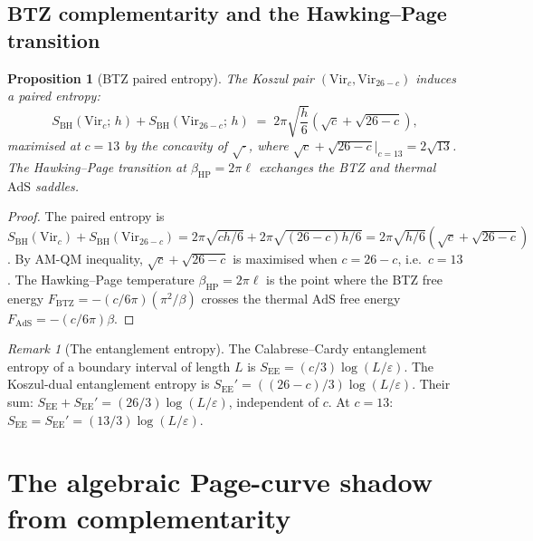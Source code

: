 \documentclass[11pt,reqno]{amsart}
\newtheorem{proposition}[theorem]{Proposition}
\theoremstyle{definition}
\theoremstyle{remark}
\newtheorem{remark}[theorem]{Remark}
\begin{document}
\subsection{BTZ complementarity and the Hawking--Page transition}

\begin{proposition}[BTZ paired entropy]
\label{prop:btz-complementarity}
The Koszul pair $(\mathrm{Vir}_c, \mathrm{Vir}_{26-c})$ induces
a paired entropy:
\begin{equation}\label{eq:btz-paired}
S_{\mathrm{BH}}(\mathrm{Vir}_c;\, h)
+ S_{\mathrm{BH}}(\mathrm{Vir}_{26-c};\, h)
\;=\;
2\pi\sqrt{\frac{h}{6}}\!\left(\sqrt{c} + \sqrt{26-c}\right)\!,
\end{equation}
maximised at $c = 13$ by the concavity of\/ $\sqrt{\cdot}$,
where
$\sqrt{c} + \sqrt{26-c}|_{c=13} = 2\sqrt{13}$.
The Hawking--Page transition at $\beta_{\mathrm{HP}} = 2\pi\ell$
exchanges the BTZ and thermal $\mathrm{AdS}$ saddles.
\end{proposition}

\begin{proof}
The paired entropy is
$S_{\mathrm{BH}}(\mathrm{Vir}_c) + S_{\mathrm{BH}}(\mathrm{Vir}_{26-c})
= 2\pi\sqrt{ch/6} + 2\pi\sqrt{(26-c)h/6}
= 2\pi\sqrt{h/6}(\sqrt{c} + \sqrt{26-c})$.
By AM-QM inequality, $\sqrt{c} + \sqrt{26-c}$ is maximised when
$c = 26-c$, i.e.\ $c = 13$. The Hawking--Page temperature
$\beta_{\mathrm{HP}} = 2\pi\ell$ is the point where the BTZ free
energy $F_{\mathrm{BTZ}} = -(c/6\pi)(\pi^2/\beta)$ crosses the
thermal $\mathrm{AdS}$ free energy
$F_{\mathrm{AdS}} = -(c/6\pi)\beta$.
\end{proof}

\begin{remark}[The entanglement entropy]
\label{rem:entanglement}
The Calabrese--Cardy entanglement entropy of a boundary interval
of length $L$ is
$S_{\mathrm{EE}} = (c/3)\log(L/\varepsilon)$.
The Koszul-dual entanglement entropy is
$S_{\mathrm{EE}}' = ((26-c)/3)\log(L/\varepsilon)$.
Their sum:
$S_{\mathrm{EE}} + S_{\mathrm{EE}}'
= (26/3)\log(L/\varepsilon)$, independent of $c$.
At $c = 13$: $S_{\mathrm{EE}} = S_{\mathrm{EE}}'
= (13/3)\log(L/\varepsilon)$.
\end{remark}

\section{The algebraic Page-curve shadow from complementarity}
\label{sec:page-curve}
\end{document}
